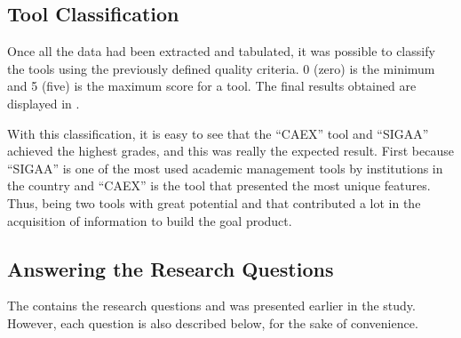 \subsection{Tool Classification}\label{sec:gl-tool-classification}

Once all the data had been extracted and tabulated, it was possible to classify the tools using the previously defined quality criteria. 0 (zero) is the minimum and 5 (five) is the maximum score for a tool. The final results obtained are displayed in .



With this classification, it is easy to see that the ``CAEX'' tool and ``\ac{SIGAA}'' achieved the highest grades, and this was really the expected result. First because ``\ac{SIGAA}'' is one of the most used academic management tools by institutions in the country and ``CAEX'' is the tool that presented the most unique features. Thus, being two tools with great potential and that contributed a lot in the acquisition of information to build the goal product.

\subsection{Answering the Research Questions}\label{sec:gl-answer-research-questions}

The  contains the research questions and was presented earlier in the study. However, each question is also described below, for the sake of convenience.

